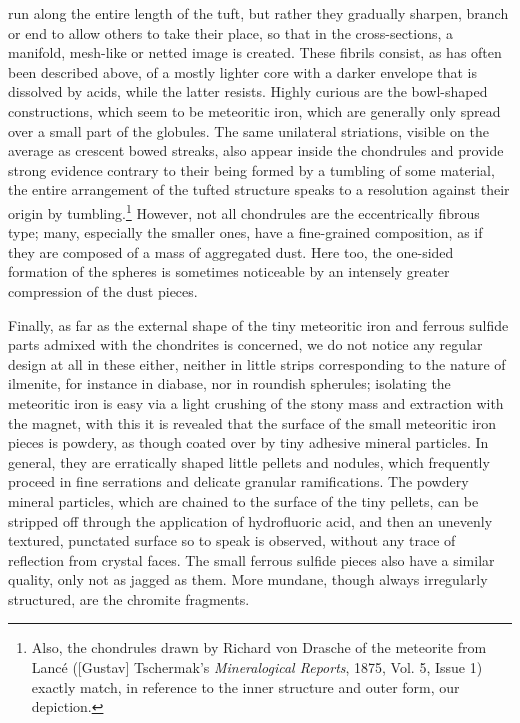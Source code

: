 \documentclass[a4paper, 12pt, oneside]{article}
\begin{document}
run along the entire length of the tuft, but rather they gradually sharpen, branch or end to allow others to take their place, so that in the cross-sections, a manifold, mesh-like or netted image is created. These fibrils consist, as has often been described above, of a mostly lighter core with a darker envelope that is dissolved by acids, while the latter resists. Highly curious are the bowl-shaped constructions, which seem to be meteoritic iron, which are generally only spread over a small part of the globules. The same unilateral striations, visible on the average as crescent bowed streaks, also appear inside the chondrules and provide strong evidence contrary to their being formed by a tumbling of some material, the entire arrangement of the tufted structure speaks to a resolution against their origin by tumbling.\footnote{Also, the chondrules drawn by Richard von Drasche of the meteorite from Lancé ([Gustav] Tschermak's \emph{Mineralogical Reports}, 1875, Vol. 5, Issue 1) exactly match, in reference to the inner structure and outer form, our depiction.} However, not all chondrules are the eccentrically fibrous type; many, especially the smaller ones, have a fine-grained composition, as if they are composed of a mass of aggregated dust. Here too, the one-sided formation of the spheres is sometimes noticeable by an intensely greater compression of the dust pieces.

Finally, as far as the external shape of the tiny meteoritic iron and ferrous sulfide parts admixed with the chondrites is concerned, we do not notice any regular design at all in these either, neither in little strips corresponding to the nature of ilmenite, for instance in diabase, nor in roundish spherules; isolating the meteoritic iron is easy via a light crushing of the stony mass and extraction with the magnet, with this it is revealed that the surface of the small meteoritic iron pieces is powdery, as though coated over by tiny adhesive mineral particles. In general, they are erratically shaped little pellets and nodules, which frequently proceed in fine serrations and delicate granular ramifications. The powdery mineral particles, which are chained to the surface of the tiny pellets, can be stripped off through the application of hydrofluoric acid, and then an unevenly textured, punctated surface so to speak is observed, without any trace of reflection from crystal faces. The small ferrous sulfide pieces also have a similar quality, only not as jagged as them. More mundane, though always irregularly structured, are the chromite fragments.
\end{document}
